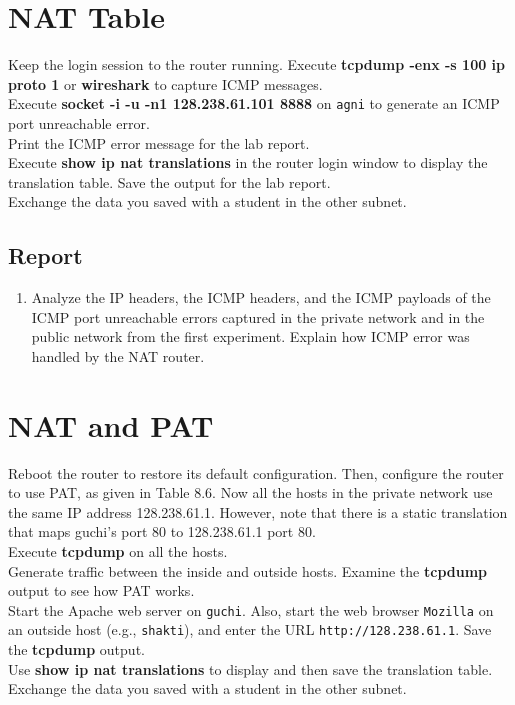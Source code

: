 \documentclass{../UTNetLab}
\begin{document}
\section{NAT Table}
    Keep the login session to the router running. Execute \textbf{tcpdump -enx -s 100 ip proto 1} or \textbf{wireshark} to capture ICMP messages. \\
    Execute \textbf{socket -i -u -n1 128.238.61.101 8888} on \texttt{agni} to generate an ICMP port unreachable error. \\
    Print the ICMP error message for the lab report. \\
    Execute \textbf{show ip nat translations} in the router login window to display the translation table.
    Save the output for the lab report.\\
    Exchange the data you saved with a student in the other subnet.
    \subsection*{Report}
    \begin{enumerate}
        \item Analyze the IP headers, the ICMP headers, and the ICMP payloads of the ICMP port unreachable errors captured in the private network and in the public network from the first experiment.
        Explain how ICMP error was handled by the NAT router.
    \end{enumerate}

\section{NAT and PAT}
    Reboot the router to restore its default configuration.
    Then, configure the router to use PAT, as given in Table 8.6. Now all the hosts in the private network use the same IP address 128.238.61.1. However, note that there is a static translation that maps guchi’s port 80 to 128.238.61.1 port 80. \\
    Execute \textbf{tcpdump} on all the hosts. \\
    Generate traffic between the inside and outside hosts.
    Examine the \textbf{tcpdump} output to see how PAT works.\\
    Start the Apache web server on \texttt{guchi}. Also, start the web browser \texttt{Mozilla} on an outside host (e.g., \texttt{shakti}), and enter the URL \texttt{http://128.238.61.1}. Save the \textbf{tcpdump} output.\\
    Use \textbf{show ip nat translations} to display and then save the translation table.
    Exchange the data you saved with a student in the other subnet.
\end{document}

